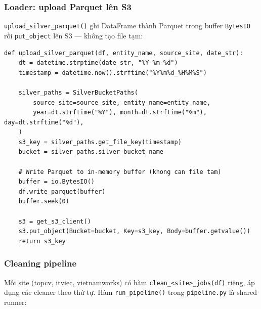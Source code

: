 \subsubsection{Loader: upload Parquet lên S3}
\label{subsubsec:silver-loader}

\texttt{upload\_silver\_parquet()} ghi DataFrame thành Parquet trong buffer
\texttt{BytesIO} rồi \texttt{put\_object} lên S3 --- không tạo file tạm:

\begin{lstlisting}[caption={\texttt{src/storage\_layer/MinIO\_S3/layer/silver/utils/loader.py}}, label={lst:silver-loader}]
def upload_silver_parquet(df, entity_name, source_site, date_str):
    dt = datetime.strptime(date_str, "%Y-%m-%d")
    timestamp = datetime.now().strftime("%Y%m%d_%H%M%S")

    silver_paths = SilverBucketPaths(
        source_site=source_site, entity_name=entity_name,
        year=dt.strftime("%Y"), month=dt.strftime("%m"), day=dt.strftime("%d"),
    )
    s3_key = silver_paths.get_file_key(timestamp)
    bucket = silver_paths.silver_bucket_name

    # Write Parquet to in-memory buffer (khong can file tam)
    buffer = io.BytesIO()
    df.write_parquet(buffer)
    buffer.seek(0)

    s3 = get_s3_client()
    s3.put_object(Bucket=bucket, Key=s3_key, Body=buffer.getvalue())
    return s3_key
\end{lstlisting}

\subsubsection{Cleaning pipeline}
\label{subsubsec:silver-pipeline}

Mỗi site (topcv, itviec, vietnamworks) có hàm \texttt{clean\_<site>\_jobs(df)}
riêng, áp dụng các cleaner theo thứ tự. Hàm \texttt{run\_pipeline()} trong
\texttt{pipeline.py} là shared runner:

